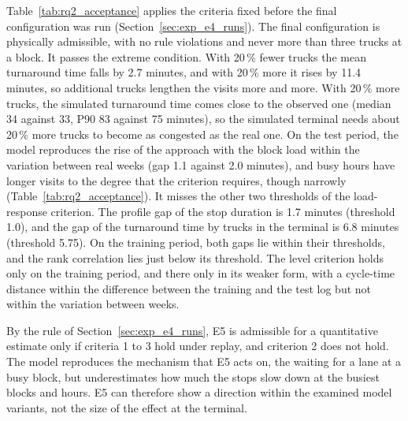 

Table~\ref{tab:rq2_acceptance} applies the criteria fixed before the final
configuration was run (Section~\ref{sec:exp_e4_runs}). The final configuration is
physically admissible, with no rule violations and never more than three trucks at a
block. It passes the extreme condition. With 20\,\% fewer trucks the mean turnaround time
falls by 2.7 minutes, and with 20\,\% more it rises by 11.4 minutes, so additional
trucks lengthen the visits more and more. With 20\,\% more trucks, the simulated
turnaround time comes close to the observed one (median 34 against 33, P90 83 against 75 minutes), so the
simulated terminal needs about 20\,\% more trucks to become as congested as the real
one. On the test period, the model reproduces the rise of the approach with the block
load within the variation between real weeks (gap 1.1 against 2.0 minutes), and busy
hours have longer visits to the degree that the criterion requires, though narrowly
(Table~\ref{tab:rq2_acceptance}). It misses the other
two thresholds of the load-response criterion. The profile gap of the stop duration is
1.7 minutes (threshold 1.0), and the gap of the turnaround time by trucks in the terminal is 6.8
minutes (threshold 5.75). On the training period, both gaps lie within their
thresholds, and the rank correlation lies just below its threshold. The level
criterion holds only on the training period, and there only in its weaker form, with
a cycle-time distance within the difference between the training and the test log but
not within the variation between weeks.

By the rule of Section~\ref{sec:exp_e4_runs}, E5 is admissible for a quantitative
estimate only if criteria 1 to 3 hold under replay, and criterion 2 does not hold.
The model reproduces the mechanism that E5 acts on, the waiting for a lane at a busy
block, but underestimates how much the stops slow down at the busiest blocks and
hours. E5 can therefore show a direction within the examined model variants, not the
size of the effect at the terminal.

